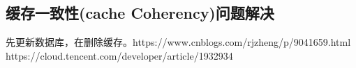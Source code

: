 \documentclass[../../../interview-questions.tex]{subfiles}
\begin{document}
\subsection{缓存一致性(cache Coherency)问题解决}

先更新数据库，在删除缓存。https://www.cnblogs.com/rjzheng/p/9041659.html
https://cloud.tencent.com/developer/article/1932934
\end{document}
